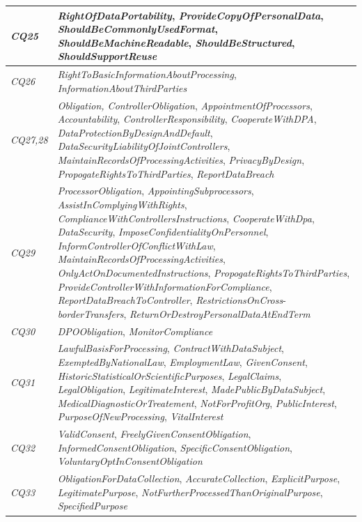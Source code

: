 \begin{table}[htbp]
\begin{tabularx}{\textwidth}{|l|X|}
\textit{CQ25} & \textit{RightOfDataPortability}, \textit{ProvideCopyOfPersonalData}, \textit{ShouldBeCommonlyUsedFormat}, \textit{ShouldBeMachineReadable}, \textit{ShouldBeStructured}, \textit{ShouldSupportReuse}  \\ \hline
\textit{CQ26} & \textit{RightToBasicInformationAboutProcessing}, \textit{InformationAboutThirdParties}  \\ \hline
\textit{CQ27,28} & \textit{Obligation, ControllerObligation}, \textit{AppointmentOfProcessors}, \textit{Accountability}, \textit{ControllerResponsibility}, \textit{CooperateWithDPA}, \textit{DataProtectionByDesignAndDefault}, \textit{DataSecurityLiabilityOfJointControllers}, \textit{MaintainRecordsOfProcessingActivities}, \textit{PrivacyByDesign}, \textit{PropogateRightsToThirdParties}, \textit{ReportDataBreach} \\ \hline
\textit{CQ29} & \textit{ProcessorObligation}, \textit{AppointingSubprocessors}, \textit{AssistInComplyingWithRights}, \textit{ComplianceWithControllersInstructions}, \textit{CooperateWithDpa}, \textit{DataSecurity}, \textit{ImposeConfidentialityOnPersonnel}, \textit{InformControllerOfConflictWithLaw}, \textit{MaintainRecordsOfProcessingActivities}, \textit{OnlyActOnDocumentedInstructions}, \textit{PropogateRightsToThirdParties}, \textit{ProvideControllerWithInformationForCompliance}, \textit{ReportDataBreachToController}, \textit{RestrictionsOnCross}-\textit{borderTransfers}, \textit{ReturnOrDestroyPersonalDataAtEndTerm} \\ \hline
\textit{CQ30} & \textit{DPOObligation}, \textit{MonitorCompliance} \\ \hline
\textit{CQ31} & \textit{LawfulBasisForProcessing}, \textit{ContractWithDataSubject}, \textit{ExemptedByNationalLaw}, \textit{EmploymentLaw}, \textit{GivenConsent}, \textit{HistoricStatisticalOrScientificPurposes}, \textit{LegalClaims}, \textit{LegalObligation}, \textit{LegitimateInterest}, \textit{MadePublicByDataSubject}, \textit{MedicalDiagnosticOrTreatement}, \textit{NotForProfitOrg}, \textit{PublicInterest}, \textit{PurposeOfNewProcessing}, \textit{VitalInterest} \\ \hline
\textit{CQ32} & \textit{ValidConsent}, \textit{FreelyGivenConsentObligation}, \textit{InformedConsentObligation}, \textit{SpecificConsentObligation}, \textit{VoluntaryOptInConsentObligation}  \\ \hline
\textit{CQ33} & \textit{ObligationForDataCollection}, \textit{AccurateCollection}, \textit{ExplicitPurpose}, \textit{LegitimatePurpose}, \textit{NotFurtherProcessedThanOriginalPurpose}, \textit{SpecifiedPurpose} \\ \hline

\end{tabularx}
\end{table}
